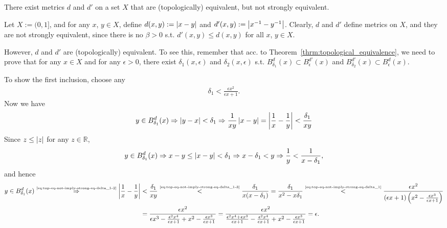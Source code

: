 \begin{remark}
	There exist metrics $d$ and $d'$ on a set $X$ that are (topologically) equivalent, but not strongly equivalent. \cite{5065146}
\end{remark}

\begin{exmp}
	Let $X := (0, 1]$, and for any $x$, $y\in X$, define $d(x, y) := \left\vert x - y \right\vert$ and \newline $d'(x, y) := \left\vert x^{-1} - y^{-1} \right\vert$. Clearly, $d$ and $d'$ define metrics on $X$, and they are not strongly equivalent, since there is no $\beta > 0$ s.t. $d'(x, y) \leq d(x, y)$ for all $x$, $y\in X$. 
	
	However, $d$ and $d'$ are (topologically) equivalent. To see this, remember that acc. to \mbox{Theorem \ref{thrm:topological_equivalence}}, we need to prove that for any $x\in X$ and for any $\epsilon > 0$, there exist $\delta_{1}(x, \epsilon)$ and $\delta_2(x, \epsilon)$ s.t. $B_{\delta_1}^{d}(x) \subset B_{\epsilon}^{d'}(x)$ and $B_{\delta_2}^{d'}(x) \subset B_{\epsilon}^{d}(x)$. 
	
	To show the first inclusion, choose any
	\begin{align}\label{eq:top-eq-not-imply-strong-eq-delta_1}
		\delta_{1} < \frac{\epsilon x^2}{\epsilon x + 1}.
	\end{align}
	Now we have 
	\begin{align}\label{eq:top-eq-not-imply-strong-eq-delta_1-2}
		y \in B_{\delta_1}^{d}(x) \Rightarrow \left\vert y - x \right\vert < \delta_1 \Rightarrow \frac{1}{xy}\left\vert x - y \right\vert = \left\vert \frac{1}{x} - \frac{1}{y} \right\vert < \frac{\delta_1}{xy}
	\end{align}
	Since $z \leq \left\vert z \right\vert$ for any $z\in\mathbb R$, 
	\begin{align}\label{eq:top-eq-not-imply-strong-eq-delta_1-3}
		y \in B_{\delta_1}^{d}(x) \Rightarrow x - y \leq \left\vert x-y \right\vert < \delta_1 \Rightarrow x - \delta_1 < y\Rightarrow \frac{1}{y} < \frac{1}{x - \delta_1},
	\end{align}
	and hence 
	\begin{align}
		y \in B_{\delta_1}^{d}(x) \overset{\tiny \eqref{eq:top-eq-not-imply-strong-eq-delta_1-2}}{\Rightarrow} \left\vert \frac{1}{x} - \frac{1}{y} \right\vert &< \frac{\delta_1}{xy} \overset{\tiny \eqref{eq:top-eq-not-imply-strong-eq-delta_1-3}}{<} \frac{\delta_1}{x(x - \delta_1)} = \frac{\delta_1}{x^2 - x\delta_1} \overset{\tiny \eqref{eq:top-eq-not-imply-strong-eq-delta_1}}{<} \frac{\epsilon x^2}{\left(\epsilon x + 1\right)\left(x^2 - \frac{\epsilon x^3}{\epsilon x + 1}\right)} 
		\\ &= \frac{\epsilon x^2}{\epsilon x^3 - \frac{\epsilon^2 x^4}{\epsilon x + 1} + x^2 - \frac{\epsilon x^3}{\epsilon x + 1}} = \frac{\epsilon x^2}{\frac{\epsilon^2 x^4 + \epsilon x^3}{\epsilon x + 1} - \frac{\epsilon^2 x^4}{\epsilon x + 1} + x^2 - \frac{\epsilon x^3}{\epsilon x + 1}} = \epsilon.
	\end{align}
	

\end{exmp}
